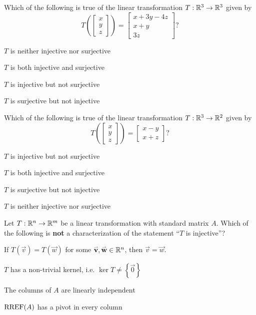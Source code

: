 \begin{readinessAssuranceTest}
\item Which of the following is true of the linear transformation $T: \mathbb{R}^3 \rightarrow \mathbb{R}^3$ given by $$T\left(\begin{bmatrix} x \\ y \\ z \end{bmatrix} \right) = \begin{bmatrix} x+3y-4z \\ x+y \\ 3z \end{bmatrix}?$$
\begin{readinessAssuranceTestChoices}
\item $T$ is neither injective nor surjective
\item $T$ is both injective and surjective %
\item $T$ is injective but not surjective
\item $T$ is surjective but not injective
\end{readinessAssuranceTestChoices}


\item Which of the following is true of the linear transformation $T:\mathbb{R}^3 \rightarrow \mathbb{R}^2$ given by $$T\left(\begin{bmatrix} x \\ y \\ z \end{bmatrix} \right) = \begin{bmatrix} x-y \\ x+z \end{bmatrix} ?$$
\begin{readinessAssuranceTestChoices}
\item $T$ is injective but not surjective
\item $T$ is both injective and surjective
\item $T$ is surjective but not injective %
\item $T$ is neither injective nor surjective
\end{readinessAssuranceTestChoices}


\item Let $T: \mathbb{R}^n \rightarrow \mathbb{R}^m$ be a linear transformation with standard matrix $A$.  Which of the following is {\bf not} a characterization of the statement ``$T$ is injective''?
\begin{readinessAssuranceTestChoices}
\item If $T(\vec{v})=T(\vec{w})$ for some $\mathbf{\accentset{\rightharpoonup}{v}}, \mathbf{\accentset{\rightharpoonup}{w}} \in \mathbb{R}^n$, then $\vec{v}=\vec{w}$.
\item $T$ has a non-trivial kernel, i.e. \(\ker T \neq \left\{ \vec{0}\right\}\) %
\item The columns of $A$ are linearly independent
\item $\operatorname{RREF}(A)$ has a pivot in every column
\end{readinessAssuranceTestChoices}



\end{readinessAssuranceTest}
